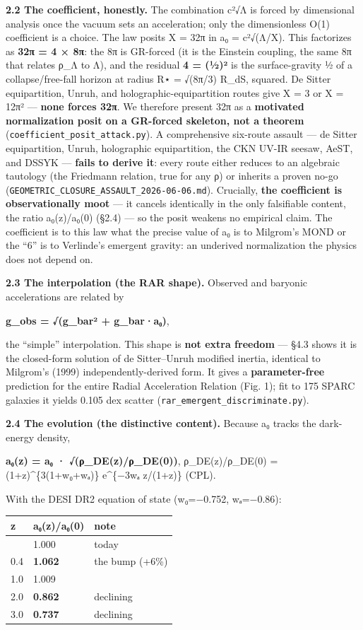\documentclass[
]{article}
\newcounter{none} %
\begin{document}
\textbf{2.2 The coefficient, honestly.} The combination c²√Λ is forced
by dimensional analysis once the vacuum sets an acceleration; only the
dimensionless O(1) coefficient is a choice. The law posits X = 32π in a₀
= c²√(Λ/X). This factorizes as \textbf{32π = 4 × 8π}: the 8π is
GR-forced (it is the Einstein coupling, the same 8π that relates ρ\_Λ to
Λ), and the residual \textbf{4 = (½)²} is the surface-gravity ½ of a
collapse/free-fall horizon at radius R⋆ = √(8π/3) R\_dS, squared. De
Sitter equipartition, Unruh, and holographic-equipartition routes give X
= 3 or X = 12π² --- \textbf{none forces 32π}. We therefore present 32π
as a \textbf{motivated normalization posit on a GR-forced skeleton, not
a theorem} (\texttt{coefficient\_posit\_attack.py}). A comprehensive
six-route assault --- de Sitter equipartition, Unruh, holographic
equipartition, the CKN UV-IR seesaw, AeST, and DSSYK --- \textbf{fails
to derive it}: every route either reduces to an algebraic tautology (the
Friedmann relation, true for any ρ) or inherits a proven no-go
(\texttt{GEOMETRIC\_CLOSURE\_ASSAULT\_2026-06-06.md}). Crucially,
\textbf{the coefficient is observationally moot} --- it cancels
identically in the only falsifiable content, the ratio a₀(z)/a₀(0)
(§2.4) --- so the posit weakens no empirical claim. The coefficient is
to this law what the precise value of a₀ is to Milgrom's MOND or the
``6'' is to Verlinde's emergent gravity: an underived normalization the
physics does not depend on.

\textbf{2.3 The interpolation (the RAR shape).} Observed and baryonic
accelerations are related by

\textbf{g\_obs = √(g\_bar² + g\_bar·a₀)},

the ``simple'' interpolation. This shape is \textbf{not extra freedom}
--- §4.3 shows it is the closed-form solution of de Sitter--Unruh
modified inertia, identical to Milgrom's (1999) independently-derived
form. It gives a \textbf{parameter-free} prediction for the entire
Radial Acceleration Relation (Fig. 1); fit to 175 SPARC galaxies it
yields 0.105 dex scatter (\texttt{rar\_emergent\_discriminate.py}).

\textbf{2.4 The evolution (the distinctive content).} Because a₀ tracks
the dark-energy density,

\textbf{a₀(z) = a₀ · √(ρ\_DE(z)/ρ\_DE(0))}, ρ\_DE(z)/ρ\_DE(0) =
(1+z)\^{}\{3(1+w₀+wₐ)\} e\^{}\{−3wₐ z/(1+z)\} (CPL).

With the DESI DR2 equation of state (w₀=−0.752, wₐ=−0.86):

{\def\LTcaptype{none} %
\begin{longtable}[]{@{}lll@{}}
\toprule\noalign{}
z & a₀(z)/a₀(0) & note \\
\midrule\noalign{}
\endhead
\bottomrule\noalign{}
\endlastfoot
0.0 & 1.000 & today \\
0.4 & \textbf{1.062} & the bump (+6\%) \\
1.0 & 1.009 & \\
2.0 & \textbf{0.862} & declining \\
3.0 & \textbf{0.737} & declining \\
\end{longtable}
}
\end{document}
